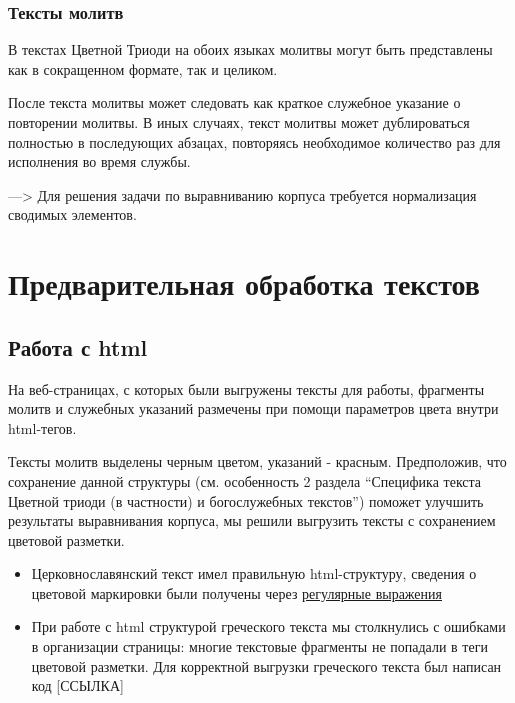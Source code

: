 \documentclass[
  letterpaper,
]{book}
\providecommand{\tightlist}{%
  \setlength{\itemsep}{0pt}\setlength{\parskip}{0pt}}\usepackage{longtable,booktabs,array}
\begin{document}
\hypertarget{ux442ux435ux43aux441ux442ux44b-ux43cux43eux43bux438ux442ux432}{%
\subsection{Тексты
молитв}\label{ux442ux435ux43aux441ux442ux44b-ux43cux43eux43bux438ux442ux432}}

В текстах Цветной Триоди на обоих языках молитвы могут быть представлены
как в сокращенном формате, так и целиком.

После текста молитвы может следовать как краткое служебное указание о
повторении молитвы. В иных случаях, текст молитвы может дублироваться
полностью в последующих абзацах, повторяясь необходимое количество раз
для исполнения во время службы.

---\textgreater{} Для решения задачи по выравниванию корпуса требуется
нормализация сводимых элементов.


\hypertarget{ux43fux440ux435ux434ux432ux430ux440ux438ux442ux435ux43bux44cux43dux430ux44f-ux43eux431ux440ux430ux431ux43eux442ux43aux430-ux442ux435ux43aux441ux442ux43eux432}{%
\chapter{\texorpdfstring{\textbf{Предварительная обработка
текстов}}{Предварительная обработка текстов}}\label{ux43fux440ux435ux434ux432ux430ux440ux438ux442ux435ux43bux44cux43dux430ux44f-ux43eux431ux440ux430ux431ux43eux442ux43aux430-ux442ux435ux43aux441ux442ux43eux432}}

\hypertarget{ux440ux430ux431ux43eux442ux430-ux441-html}{%
\section{Работа с
html}\label{ux440ux430ux431ux43eux442ux430-ux441-html}}

На веб-страницах, с которых были выгружены тексты для работы, фрагменты
молитв и служебных указаний размечены при помощи параметров цвета внутри
html-тегов.

Тексты молитв выделены черным цветом, указаний - красным. Предположив,
что сохранение данной структуры (см. особенность 2 раздела ``Специфика
текста Цветной триоди (в частности) и богослужебных текстов'') поможет
улучшить результаты выравнивания корпуса, мы решили выгрузить тексты с
сохранением цветовой разметки.

\begin{itemize}
\tightlist
\item
  Церковнославянский текст имел правильную html-структуру, сведения о
  цветовой маркировки были получены через
  \href{https://github.com/Drozhzhinastya/GSPC/blob/main/texts/csl_tsvetnaya_triod/scrape.ipynb}{регулярные
  выражения}
\item
  При работе с html структурой греческого текста мы столкнулись с
  ошибками в организации страницы: многие текстовые фрагменты не
  попадали в теги цветовой разметки. Для корректной выгрузки греческого
  текста был написан код {[}ССЫЛКА{]}
\end{itemize}
\end{document}
